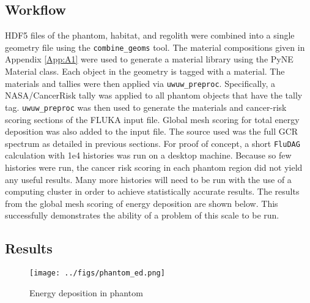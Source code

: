 \subsection*{Workflow}
HDF5 files of the phantom, habitat, and regolith were combined into a single geometry file
using the \texttt{combine\_geoms} tool.  The material compositions given in Appendix \ref{App:A1}
were used to generate a material library using the PyNE Material class.  Each object in
the geometry is tagged with a material.  The materials and tallies were then applied via
\texttt{uwuw\_preproc}.  Specifically, a NASA/CancerRisk tally was applied to all phantom
objects that have the tally tag. \texttt{uwuw\_preproc} was then used to generate the 
materials and cancer-risk scoring sections of the FLUKA input file.  Global mesh scoring 
for total energy deposition was also added to the input file.  The source used was the 
full GCR spectrum as detailed in previous sections.  For proof of concept, a short \texttt{FluDAG}
calculation with 1e4 histories was run on a desktop machine.  Because so few histories 
were run, the cancer risk scoring in each phantom region did not yield any useful results.  
Many more histories will need to be run with the use of a computing cluster in order to 
achieve statistically accurate results.  The results from the global mesh scoring of 
energy deposition are shown below.  This successfully demonstrates the ability of a problem
of this scale to be run.  


\subsection*{Results}


\begin{figure}
 \begin{centering}
 \centering
 \texttt{[image: ../figs/phantom\_ed.png]}
 \caption{Energy deposition in phantom}
 \end{centering}
\end{figure}
